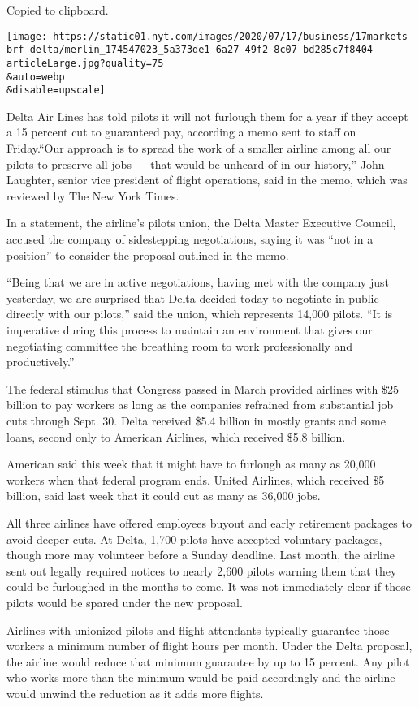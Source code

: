 Copied to clipboard.

\texttt{[image: https://static01.nyt.com/images/2020/07/17/business/17markets-brf-delta/merlin\_174547023\_5a373de1-6a27-49f2-8c07-bd285c7f8404-articleLarge.jpg?quality=75\\\&auto=webp\\\&disable=upscale]}

Delta Air Lines has told pilots it will not furlough them for a year if
they accept a 15 percent cut to guaranteed pay, according a memo sent to
staff on Friday.``Our approach is to spread the work of a smaller
airline among all our pilots to preserve all jobs --- that would be
unheard of in our history,'' John Laughter, senior vice president of
flight operations, said in the memo, which was reviewed by The New York
Times.

In a statement, the airline's pilots union, the Delta Master Executive
Council, accused the company of sidestepping negotiations, saying it was
``not in a position'' to consider the proposal outlined in the memo.

``Being that we are in active negotiations, having met with the company
just yesterday, we are surprised that Delta decided today to negotiate
in public directly with our pilots,'' said the union, which represents
14,000 pilots. ``It is imperative during this process to maintain an
environment that gives our negotiating committee the breathing room to
work professionally and productively.''

The federal stimulus that Congress passed in March provided airlines
with \$25 billion to pay workers as long as the companies refrained from
substantial job cuts through Sept. 30. Delta received \$5.4 billion in
mostly grants and some loans, second only to American Airlines, which
received \$5.8 billion.

American said this week that it might have to furlough as many as 20,000
workers when that federal program ends. United Airlines, which received
\$5 billion, said last week that it could cut as many as 36,000 jobs.

All three airlines have offered employees buyout and early retirement
packages to avoid deeper cuts. At Delta, 1,700 pilots have accepted
voluntary packages, though more may volunteer before a Sunday deadline.
Last month, the airline sent out legally required notices to nearly
2,600 pilots warning them that they could be furloughed in the months to
come. It was not immediately clear if those pilots would be spared under
the new proposal.

Airlines with unionized pilots and flight attendants typically guarantee
those workers a minimum number of flight hours per month. Under the
Delta proposal, the airline would reduce that minimum guarantee by up to
15 percent. Any pilot who works more than the minimum would be paid
accordingly and the airline would unwind the reduction as it adds more
flights.

